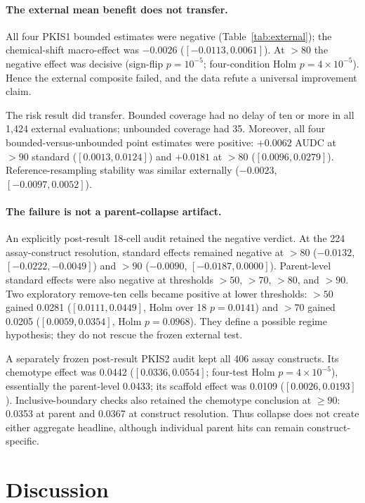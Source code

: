 \documentclass{article}
\begin{document}
\paragraph{The external mean benefit does not transfer.}
All four PKIS1 bounded estimates were negative (Table~\ref{tab:external}); the
chemical-shift macro-effect was $-0.0026$ ($[-0.0113,0.0061]$). At $>80$ the
negative effect was decisive (sign-flip $p=10^{-5}$; four-condition Holm
$p=4\times10^{-5}$). Hence the external composite failed, and the data refute
a universal improvement claim.

The risk result did transfer. Bounded coverage had no delay of ten or more in
all 1,424 external evaluations; unbounded coverage had 35. Moreover, all four
bounded-versus-unbounded point estimates were positive: $+0.0062$ AUDC at $>90$ standard
($[0.0013,0.0124]$) and $+0.0181$ at $>80$
($[0.0096,0.0279]$). Reference-resampling stability was similar externally
($-0.0023$, $[-0.0097,0.0052]$).

\paragraph{The failure is not a parent-collapse artifact.}
An explicitly post-result 18-cell audit retained the negative verdict. At the
224 assay-construct resolution, standard effects remained negative at $>80$
($-0.0132$, $[-0.0222,-0.0049]$) and $>90$ ($-0.0090$,
$[-0.0187,0.0000]$). Parent-level standard effects were also negative at
thresholds $>50$, $>70$, $>80$, and $>90$. Two exploratory remove-ten cells
became positive at lower thresholds: $>50$ gained 0.0281
($[0.0111,0.0449]$, Holm over 18 $p=0.0141$) and $>70$ gained 0.0205
($[0.0059,0.0354]$, Holm $p=0.0968$). They define a possible regime
hypothesis; they do not rescue the frozen external test.

A separately frozen post-result PKIS2 audit kept all 406 assay constructs. Its
chemotype effect was 0.0442 ($[0.0336,0.0554]$; four-test Holm
$p=4\times10^{-5}$), essentially the parent-level 0.0433; its scaffold effect
was 0.0109 ($[0.0026,0.0193]$). Inclusive-boundary checks also retained the
chemotype conclusion at $\geq90$: 0.0353 at parent and 0.0367 at construct
resolution. Thus collapse does not create either aggregate headline, although
individual parent hits can remain construct-specific.

\section{Discussion}
\end{document}
